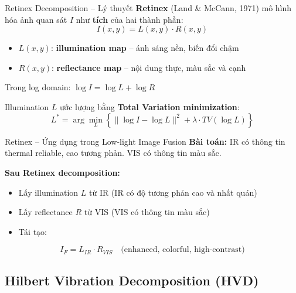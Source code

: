 \documentclass{beamer}
\begin{document}
\begin{frame}{Retinex Decomposition -- Lý thuyết}
    \textbf{Retinex} (Land \& McCann, 1971) mô hình hóa ảnh quan sát $I$ như \textbf{tích} của hai thành phần:
    \begin{equation}
        I(x,y) = L(x,y) \cdot R(x,y)
    \end{equation}
    \begin{itemize}
        \item $L(x,y)$: \textbf{illumination map} -- ánh sáng nền, biến đổi chậm
        \item $R(x,y)$: \textbf{reflectance map} -- nội dung thực, màu sắc và cạnh
    \end{itemize}

    \vspace{0.2cm}
    Trong log domain: $\log I = \log L + \log R$

    \vspace{0.2cm}
    Illumination $L$ ước lượng bằng \textbf{Total Variation minimization}:
    \begin{equation}
        L^* = \arg\min_L \left\{\|\log I - \log L\|^2 + \lambda \cdot TV(\log L)\right\}
    \end{equation}
\end{frame}

\begin{frame}{Retinex -- Ứng dụng trong Low-light Image Fusion}
    \textbf{Bài toán:} IR có thông tin thermal reliable, cao tương phản. VIS có thông tin màu sắc.

    \vspace{0.3cm}
    \textbf{Sau Retinex decomposition:}
    \begin{itemize}
        \item Lấy illumination $L$ từ IR (IR có độ tương phản cao và nhất quán)
        \item Lấy reflectance $R$ từ VIS (VIS có thông tin màu sắc)
        \item Tái tạo:
    \end{itemize}
    \begin{equation}
        I_F = L_{IR} \cdot R_{VIS} \quad \text{(enhanced, colorful, high-contrast)}
    \end{equation}
\end{frame}

\subsection{Hilbert Vibration Decomposition (HVD)}
\end{document}
